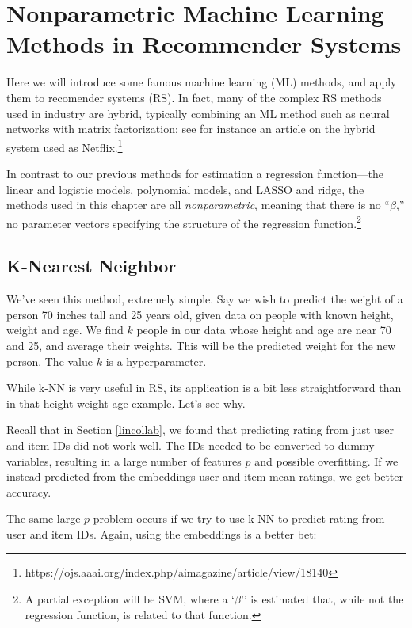 \chapter{Nonparametric Machine Learning Methods in Recommender Systems}
\label{chap:ml}

Here we will introduce some famous machine learning (ML) methods, and apply
them to recomender systems (RS).  In fact, many of the complex RS
methods used in industry are hybrid, typically combining an ML method
such as neural networks with matrix factorization; see for instance an
article on the hybrid system used as Netflix.\footnote{https://ojs.aaai.org/index.php/aimagazine/article/view/18140}

In contrast to our previous methods for estimation a regression
function---the linear and logistic models, polynomial models, and LASSO
and ridge, the methods used in this chapter are all
\textit{nonparametric}, meaning that there is no ``$\beta$,'' no
parameter vectors specifying the structure of the regression
function.\footnote{A partial exception will be SVM, where a `$\beta$''
is estimated that, while not the regression function, is related to that
function.}

\section{K-Nearest Neighbor}

We've seen this method, extremely simple.  Say we wish to predict the
weight of a person 70 inches tall and 25 years old, given
data on people with known height, weight and age.  We find $k$
people in our data whose height and age are near 70 and 25, and average
their weights.  This will be the predicted weight for the new person.
The value $k$ is a hyperparameter.

While k-NN is very useful in RS, its application is a bit less
straightforward than in that height-weight-age example.  Let's see why.

Recall that in Section \ref{lincollab}, we found that predicting rating
from just user and item IDs did not work well.  The IDs needed to be
converted to dummy variables, resulting in a large number of features $p$
and possible overfitting.  If we instead predicted from the embeddings
user and item mean ratings, we get better accuracy.

The same large-$p$ problem occurs if we try to use k-NN to predict
rating from user and item IDs.  Again, using the embeddings is a better
bet:

